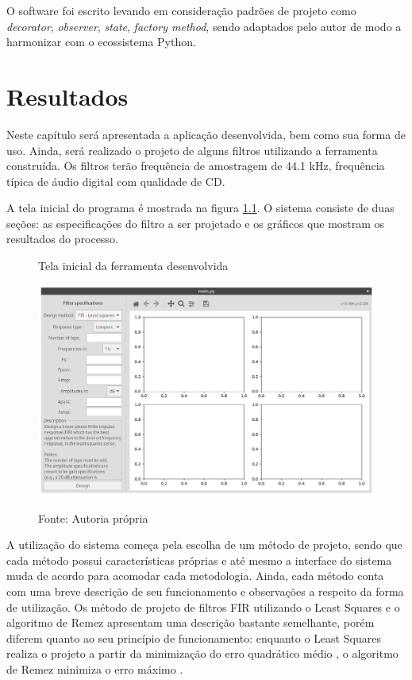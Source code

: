 \documentclass[12pt,a4paper]{report}
\begin{document}
  O software foi escrito levando em consideração padrões de projeto \cite{gang_of_four} como \textit{decorator},
  \textit{observer}, \textit{state}, \textit{factory method}, sendo adaptados pelo autor de modo a harmonizar
  com o ecossistema Python.

\chapter{Resultados}
  Neste capítulo será apresentada a aplicação desenvolvida, bem como sua forma de uso. Ainda, será realizado o
  projeto de alguns filtros utilizando a ferramenta construída. Os filtros terão frequência de amostragem de
  44.1 kHz, frequência típica de áudio digital com qualidade de CD.

  A tela inicial do programa é mostrada na figura \ref{fig:home}. O sistema consiste de duas seções: as
  especificações do filtro a ser projetado e os gráficos que mostram os resultados do processo.
  \begin{figure}[H]
    \caption{Tela inicial da ferramenta desenvolvida}
    \centering
    \includegraphics[width=\textwidth]{images/home}
    \label{fig:home}
    \caption*{Fonte: Autoria própria}
  \end{figure}

  A utilização do sistema começa pela escolha de um método de projeto, sendo que cada método possui
  características próprias e até mesmo a interface do sistema muda de acordo para acomodar cada metodologia.
  Ainda, cada método conta com uma breve descrição de seu funcionamento e observações a respeito da forma de
  utilização. Os método de projeto de filtros FIR utilizando o Least Squares e o algoritmo de Remez apresentam
  uma descrição bastante semelhante, porém diferem quanto ao seu princípio de funcionamento: enquanto o Least
  Squares realiza o projeto a partir da minimização do erro quadrático médio \cite{selesnick}, o algoritmo de
  Remez minimiza o erro máximo \cite{mcclellan_parks}.
\end{document}
